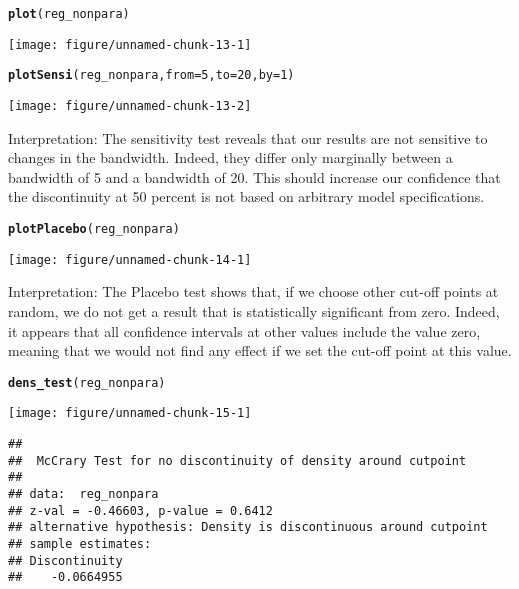 \documentclass[12pt]{article}\usepackage[]{graphicx}\usepackage[]{color}
\makeatletter
\def\maxwidth{ %
  \ifdim\Gin@nat@width>\linewidth
    \linewidth
  \else
    \Gin@nat@width
  \fi
}
\newcommand{\hlnum}[1]{\textcolor[rgb]{0.686,0.059,0.569}{#1}}%
\newcommand{\hlstd}[1]{\textcolor[rgb]{0.345,0.345,0.345}{#1}}%
\newcommand{\hlkwc}[1]{\textcolor[rgb]{0.333,0.667,0.333}{#1}}%
\newcommand{\hlkwd}[1]{\textcolor[rgb]{0.737,0.353,0.396}{\textbf{#1}}}%
\newenvironment{kframe}{%
 \def\at@end@of@kframe{}%
 \ifinner\ifhmode%
  \def\at@end@of@kframe{\end{minipage}}%
  \begin{minipage}{\columnwidth}%
 \fi\fi%
 \def\FrameCommand##1{\hskip\@totalleftmargin \hskip-\fboxsep
 \colorbox{shadecolor}{##1}\hskip-\fboxsep
     \hskip-\linewidth \hskip-\@totalleftmargin \hskip\columnwidth}%
 \MakeFramed {\advance\hsize-\width
   \@totalleftmargin\z@ \linewidth\hsize
   \@setminipage}}%
 {\par\unskip\endMakeFramed%
 \at@end@of@kframe}
\newenvironment{knitrout}{}{} %
\makeatother
\begin{document}
\begin{knitrout}
\color{fgcolor}\begin{kframe}
\begin{alltt}
\hlkwd{plot}\hlstd{(reg_nonpara)}
\end{alltt}
\end{kframe}
\texttt{[image: figure/unnamed-chunk-13-1]} 
\begin{kframe}\begin{alltt}
\hlkwd{plotSensi}\hlstd{(reg_nonpara,} \hlkwc{from} \hlstd{=} \hlnum{5}\hlstd{,} \hlkwc{to} \hlstd{=} \hlnum{20}\hlstd{,} \hlkwc{by} \hlstd{=} \hlnum{1}\hlstd{)}
\end{alltt}
\end{kframe}
\texttt{[image: figure/unnamed-chunk-13-2]} 

\end{knitrout}

Interpretation: The sensitivity test reveals that our results are not sensitive to changes in the bandwidth. Indeed, they differ only marginally between a bandwidth of 5 and a bandwidth of 20. This should increase our confidence that the discontinuity at 50 percent is not based on arbitrary model specifications.

\begin{knitrout}
\color{fgcolor}\begin{kframe}
\begin{alltt}
\hlkwd{plotPlacebo}\hlstd{(reg_nonpara)}
\end{alltt}
\end{kframe}
\texttt{[image: figure/unnamed-chunk-14-1]} 

\end{knitrout}

Interpretation: The Placebo test shows that, if we choose other cut-off points at random, we do not get a result that is statistically significant from zero. Indeed, it appears that all confidence intervals at other values include the value zero, meaning that we would not find any effect if we set the cut-off point at this value.

\begin{knitrout}
\color{fgcolor}\begin{kframe}
\begin{alltt}
\hlkwd{dens_test}\hlstd{(reg_nonpara)}
\end{alltt}
\end{kframe}
\texttt{[image: figure/unnamed-chunk-15-1]} 
\begin{kframe}\begin{verbatim}
## 
## 	McCrary Test for no discontinuity of density around cutpoint
## 
## data:  reg_nonpara
## z-val = -0.46603, p-value = 0.6412
## alternative hypothesis: Density is discontinuous around cutpoint
## sample estimates:
## Discontinuity 
##    -0.0664955
\end{verbatim}
\end{kframe}
\end{knitrout}
\end{document}
